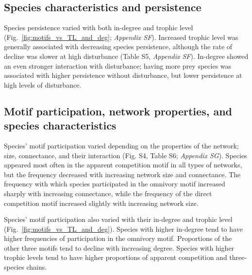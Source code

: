 \documentclass[12pt]{article}
\begin{document}
\begin{spacing}{2.0}
    \subsection*{Species characteristics and persistence}
    
        Species persistence varied with both in-degree and trophic level (Fig.~\ref{fig:motifs_vs_TL_and_deg}; \emph{Appendix SF}). 
        Increased trophic level was generally associated with decreasing species persistence, although the rate of decline was slower at high disturbance (Table S5, \emph{Appendix SF}).
        In-degree showed an even stronger interaction with disturbance; having more prey species was associated with higher persistence without disturbance, but lower persistence at high levels of disturbance.


    
    \subsection*{Motif participation, network properties, and species characteristics}

       Species' motif participation varied depending on the properties of the network; size, connectance, and their interaction (Fig. S4, Table S6; \emph{Appendix SG}).
        Species appeared most often in the apparent competition motif in all types of networks, but the frequency decreased with increasing network size and connectance.
        The frequency with which species participated in the omnivory motif increased sharply with increasing connectance, while the frequency of the direct competition motif increased slightly with increasing network size. 
        
        Species' motif participation also varied with their in-degree and trophic level (Fig.~\ref{fig:motifs_vs_TL_and_deg}).
        Species with higher in-degree tend to have higher frequencies of participation in the omnivory motif. Proportions of the other three motifs tend to decline with increasing degree.
        Species with higher trophic levels tend to have higher proportions of apparent competition and three-species chains. 
        


\end{spacing}
\end{document}
